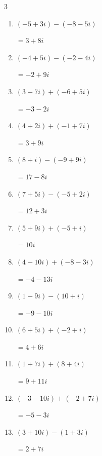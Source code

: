 \begin{multicols}{3}
\begin{enumerate}
  \item $\displaystyle (-5+3i) - (-8-5i)$

        $\displaystyle =3+8i$

  \item $\displaystyle (-4+5i) - (-2-4i)$

        $\displaystyle =-2+9i$

  \item $\displaystyle (3-7i) + (-6+5i)$

        $\displaystyle =-3-2i$

  \item $\displaystyle (4+2i) + (-1+7i)$

        $\displaystyle =3+9i$

  \item $\displaystyle (8+i) - (-9+9i)$

        $\displaystyle =17-8i$

  \item $\displaystyle (7+5i) - (-5+2i)$

        $\displaystyle =12+3i$

  \item $\displaystyle (5+9i) + (-5+i)$

        $\displaystyle =10i$

  \item $\displaystyle (4-10i) + (-8-3i)$

        $\displaystyle =-4-13i$

\columnbreak %

\resetques

  \item $\displaystyle (1-9i) - (10+i)$

        $\displaystyle =-9-10i$

  \item $\displaystyle (6+5i) + (-2+i)$

        $\displaystyle =4+6i$

  \item $\displaystyle (1+7i) + (8+4i)$

        $\displaystyle =9+11i$

  \item $\displaystyle (-3-10i) + (-2+7i)$

        $\displaystyle =-5-3i$

  \item $\displaystyle (3+10i) - (1+3i)$

        $\displaystyle =2+7i$


\end{enumerate}
\end{multicols}
